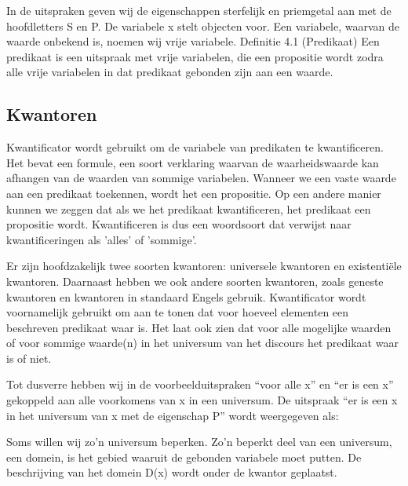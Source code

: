 \documentclass{article}
\begin{document}
	
	
	In de uitspraken geven wij de eigenschappen sterfelijk en priemgetal aan met de hoofdletters
	S en P. De variabele x stelt objecten voor. Een variabele, waarvan de waarde onbekend
	is, noemen wij vrije variabele.
	Definitie 4.1 (Predikaat) Een predikaat is een uitspraak met vrije variabelen, die een
	propositie wordt zodra alle vrije variabelen in dat predikaat gebonden zijn aan een waarde.
	
	\subsection{Kwantoren}
	
	Kwantificator wordt gebruikt om de variabele van predikaten te kwantificeren. Het bevat een formule, een soort verklaring waarvan de waarheidswaarde kan afhangen van de waarden van sommige variabelen. Wanneer we een vaste waarde aan een predikaat toekennen, wordt het een propositie. Op een andere manier kunnen we zeggen dat als we het predikaat kwantificeren, het predikaat een propositie wordt. Kwantificeren is dus een woordsoort dat verwijst naar kwantificeringen als 'alles' of 'sommige'.
	
	Er zijn hoofdzakelijk twee soorten kwantoren: universele kwantoren en existentiële kwantoren. Daarnaast hebben we ook andere soorten kwantoren, zoals geneste kwantoren en kwantoren in standaard Engels gebruik. Kwantificator wordt voornamelijk gebruikt om aan te tonen dat voor hoeveel elementen een beschreven predikaat waar is. Het laat ook zien dat voor alle mogelijke waarden of voor sommige waarde(n) in het universum van het discours het predikaat waar is of niet.
	
	
	Tot dusverre hebben wij in de voorbeelduitspraken “voor alle x” en “er is een x” gekoppeld
	aan alle voorkomens van x in een universum. De uitspraak “er is een x in het
	universum van x met de eigenschap P” wordt weergegeven als:
	
	
	Soms willen wij zo’n universum beperken. Zo’n beperkt deel van een universum, een
	domein, is het gebied waaruit de gebonden variabele moet putten. De beschrijving van
	het domein D(x) wordt onder de kwantor geplaatst.
	
\end{document}
